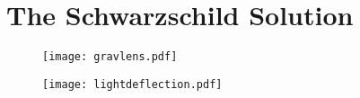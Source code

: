 \chapter{The Schwarzschild Solution}
\begin{figure}[hbtp!]
\centering
 \texttt{[image: gravlens.pdf]}
\caption{}
\end{figure}
\begin{figure}[hbtp!]
\centering
 \texttt{[image: lightdeflection.pdf]}
\caption{}
\end{figure}

